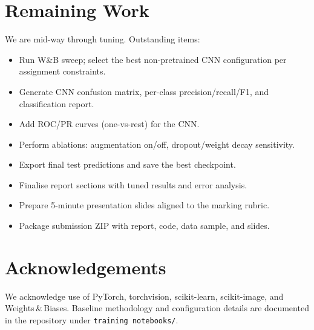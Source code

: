 \documentclass[11pt,a4paper]{article}
\begin{document}
\section{Remaining Work}
We are mid-way through tuning. Outstanding items:\vspace{-0.3em}
\begin{itemize}
  \item Run W\&B sweep; select the best non-pretrained CNN configuration per assignment constraints.
  \item Generate CNN confusion matrix, per-class precision/recall/F1, and classification report.
  \item Add ROC/PR curves (one-vs-rest) for the CNN.
  \item Perform ablations: augmentation on/off, dropout/weight decay sensitivity.
  \item Export final test predictions and save the best checkpoint.
  \item Finalise report sections with tuned results and error analysis.
  \item Prepare 5-minute presentation slides aligned to the marking rubric.
  \item Package submission ZIP with report, code, data sample, and slides.
\end{itemize}

\section*{Acknowledgements}
We acknowledge use of PyTorch, torchvision, scikit-learn, scikit-image, and Weights\,&\,Biases. Baseline methodology and configuration details are documented in the repository under \texttt{training notebooks/}.
\end{document}
